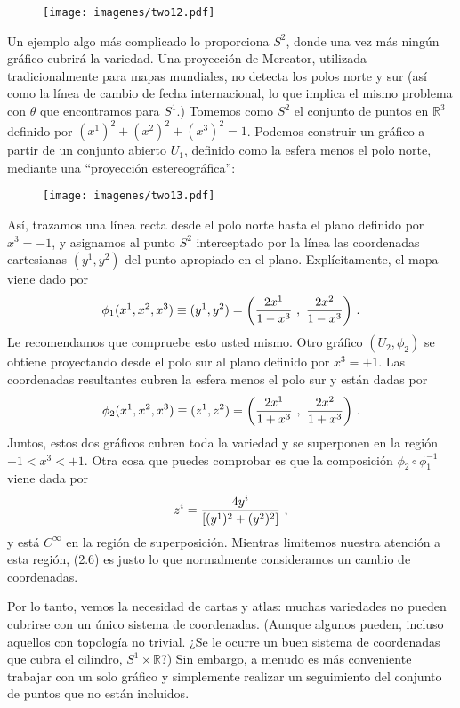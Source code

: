 \documentclass[11pt,b5paper,openany,twoside]{book}
\newcommand{\R}{\mathbb{R}}
\begin{document}
\begin{figure}[h]
\centering
\texttt{[image: imagenes/two12.pdf]}
\end{figure}

Un ejemplo algo más complicado lo proporciona $S^2$, donde una vez más ningún gráfico cubrirá la variedad.
Una proyección de Mercator, utilizada tradicionalmente para mapas mundiales, no detecta los polos norte y sur (así como la línea de cambio de fecha internacional, lo que implica el mismo problema con $\theta$ que encontramos para $S^1$.)
Tomemos como $S^2$ el conjunto de puntos en $\R^3$ definido por $(x^1)^2 +(x^2)^2 +(x^3)^2 =1$.
Podemos construir un gráfico a partir de un conjunto abierto $U_1$, definido como la esfera menos el polo norte, mediante una ``proyección estereográfica'':

\begin{figure}[h]
\centering
\texttt{[image: imagenes/two13.pdf]}
\end{figure}

\noindent
Así, trazamos una línea recta desde el polo norte hasta el plano definido por $x^3 = -1$, y asignamos al punto $S^2$ interceptado por la línea las coordenadas cartesianas $(y^1,y^2)$ del punto apropiado en el plano.
Explícitamente, el mapa viene dado por
\begin{equation}
\phi_1(x^1,x^2,x^3) \equiv (y^1,y^2) = \left(
{{2x^1}\over{1-x^3}}\ ,\ {{2x^2}\over{1-x^3}}\right)\,.\label{2.4}
\end{equation}
Le recomendamos que compruebe esto usted mismo.
Otro gráfico $(U_2,\phi_2)$ se obtiene proyectando desde el polo sur al plano definido por $x^3 = +1$.
Las coordenadas resultantes cubren la esfera menos el polo sur y están dadas por
\begin{equation}
\phi_2(x^1,x^2,x^3) \equiv (z^1,z^2) = \left(
{{2x^1}\over{1+x^3}}\ ,\ {{2x^2}\over{1+x^3}}\right)\,.\label{2.5}
\end{equation}
Juntos, estos dos gráficos cubren toda la variedad y se superponen en la región $-1<x^3<+1$.
Otra cosa que puedes comprobar es que la composición $\phi_2\circ\phi_1^{-1}$ viene dada por
\begin{equation}
z^i = {{4y^i}\over{[(y^1)^2 +(y^2)^2]}}\ ,\label{2.6}
\end{equation}
y está $C^\infty$ en la región de superposición.
Mientras limitemos nuestra atención a esta región, (2.6) es justo lo que normalmente consideramos un cambio de coordenadas.

Por lo tanto, vemos la necesidad de cartas y atlas: muchas variedades no pueden cubrirse con un único sistema de coordenadas.
(Aunque algunos pueden, incluso aquellos con topología no trivial.
¿Se le ocurre un buen sistema de coordenadas que cubra el cilindro, $S^1\times\R$?) Sin embargo, a menudo es más conveniente trabajar con un solo gráfico y simplemente realizar un seguimiento del conjunto de puntos que no están incluidos.
\end{document}
